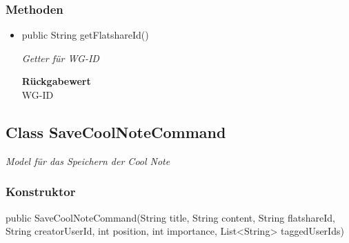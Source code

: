 \documentclass[a4paper]{scrreprt}
\begin{document}
    \subsubsection{Methoden}
    \begin{itemize}
    	\item{public String getFlatshareId()}
    	
    	\textit{Getter für WG-ID}
    	
    	
    	
    	\textbf{Rückgabewert} \\
    	WG-ID
    \end{itemize}
    \subsection{Class SaveCoolNoteCommand}
    \textit{Model für das Speichern der Cool Note}
    \subsubsection{Konstruktor}
    public SaveCoolNoteCommand(String title, String content, String flatshareId, String creatorUserId, int position, int importance, List<String> taggedUserIds)
\end{document}
